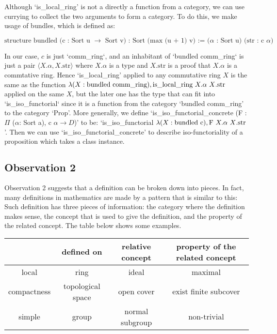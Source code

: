 \documentclass[11pt]{article}
\begin{document}
Although `is\_local\_ring' is not a directly a function from a category, we can use currying to collect the two arguments to form a category. To do this, we make usage of bundles, which is defined as:

\[\text{structure bundled (c : Sort u $\to$ Sort v) : Sort (max (u + 1) v) :=
($\alpha$ : Sort u)
(str : c $\alpha$)}\]

In our case, $c$ is just `comm\_ring`, and an inhabitant of `bundled comm\_ring` is just a pair $\langle X.\alpha,X.\text{str}\rangle$ where 
$X.\alpha$ is a type and $X.\text{str}$ is a proof that $X.\alpha$ is a commtative ring. Hence `is\_local\_ring' applied to any commutative ring $X$ is the same as the function $\lambda (X: \text{bundled comm\_ring}), \text{is\_local\_ring $X.\alpha$ $X$\text{.str}}$ applied on the same $X$, but the later one has the type that can fit into `is\_iso\_functorial` since it is a function from the category `bundled comm\_ring' to the category `Prop'. More generally, we define `is\_iso\_functorial\_concrete (F : $\Pi$ ($\alpha$: Sort a), c $\alpha \to D$)' to be: `is\_iso\_functorial $\lambda (X: \text{bundled c}), \text{F $X.\alpha$ $X$\text{.str}}$'. Then we can use `is\_iso\_functorial\_concrete' to describe iso-functoriality of a proposition which takes a class instance.



\subsection{Observation 2}

Observation 2 suggests that a definition can be broken down into pieces. In fact, many definitions in mathematics are made by a pattern that is similar to this: Such definition has three pieces of information: the category where the definition makes sense, the concept that is used to give the definition, and the property of the related concept. The table below shows some examples.

\begin{center}
    \begin{tabular}{||c c c c||} 
    \hline
     & defined on & relative concept & property of the related concept \\
    \hline\hline
    local & ring & ideal & maximal \\ 
    \hline
    compactness & topological space & open cover & exist finite subcover\\
    \hline
    simple & group & normal subgroup & non-trivial \\
    \hline
   \end{tabular}
   \end{center}
\end{document}
